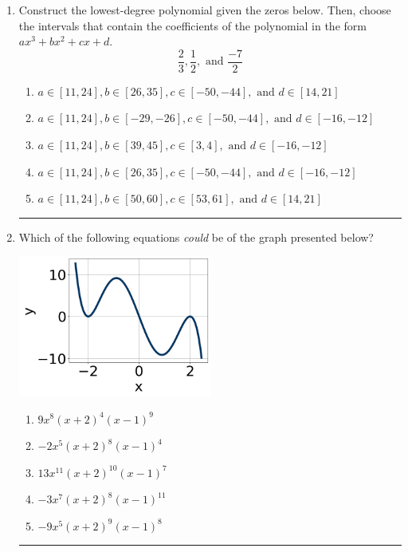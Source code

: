 \documentclass[14pt]{extbook}
\newcommand{\litem}[1]{\item#1\hspace*{-1cm}\rule{\textwidth}{0.4pt}}
\begin{document}
\begin{enumerate}
\litem{
Construct the lowest-degree polynomial given the zeros below. Then, choose the intervals that contain the coefficients of the polynomial in the form $ax^3+bx^2+cx+d$.\[ \frac{2}{3}, \frac{1}{2}, \text{ and } \frac{-7}{2} \]\begin{enumerate}[label=\Alph*.]
\item \( a \in [11, 24], b \in [26, 35], c \in [-50, -44], \text{ and } d \in [14, 21] \)
\item \( a \in [11, 24], b \in [-29, -26], c \in [-50, -44], \text{ and } d \in [-16, -12] \)
\item \( a \in [11, 24], b \in [39, 45], c \in [3, 4], \text{ and } d \in [-16, -12] \)
\item \( a \in [11, 24], b \in [26, 35], c \in [-50, -44], \text{ and } d \in [-16, -12] \)
\item \( a \in [11, 24], b \in [50, 60], c \in [53, 61], \text{ and } d \in [14, 21] \)

\end{enumerate} }
\litem{
Which of the following equations \textit{could} be of the graph presented below?
\begin{center}
    \includegraphics[width=0.5\textwidth]{../Figures/polyGraphToFunctionC.png}
\end{center}
\begin{enumerate}[label=\Alph*.]
\item \( 9x^{8} (x + 2)^{4} (x - 1)^{9} \)
\item \( -2x^{5} (x + 2)^{8} (x - 1)^{4} \)
\item \( 13x^{11} (x + 2)^{10} (x - 1)^{7} \)
\item \( -3x^{7} (x + 2)^{8} (x - 1)^{11} \)
\item \( -9x^{5} (x + 2)^{9} (x - 1)^{8} \)


\end{enumerate}}
\end{enumerate}
\end{document}
